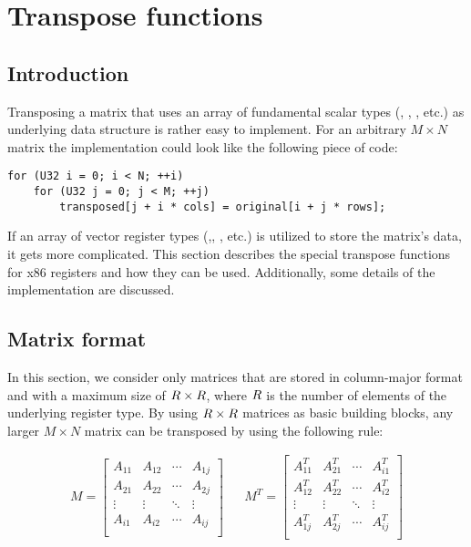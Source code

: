 \section{Transpose functions}

\subsection{Introduction}
Transposing a matrix that uses an array of fundamental scalar types (, , , etc.) as underlying data structure is rather easy to implement.
For an arbitrary $M \times N$ matrix the implementation could look like the following piece of code:

\begin{verbatim}
for (U32 i = 0; i < N; ++i)
    for (U32 j = 0; j < M; ++j)
        transposed[j + i * cols] = original[i + j * rows];
\end{verbatim}

If an array of vector register types (,, , etc.) is utilized to store the matrix's data, it gets more complicated.
This section describes the special transpose functions for x86 registers and how they can be used.
Additionally, some details of the implementation are discussed.

\subsection{Matrix format}
\label{sec:transpose_matrix_format}
In this section, we consider only matrices that are stored in column-major format and with a maximum size of $R \times R$, where $R$ is the number of elements of the underlying register type.
By using $R \times R$ matrices as basic building blocks, any larger $M \times N$ matrix can be transposed by using the following rule:

\begin{align}
\label{eq:block_matrix_transpose}
M =
\begin{bmatrix}
A_{11} & A_{12} & \cdots & A_{1j}\\
A_{21} & A_{22} & \cdots & A_{2j}\\
\vdots & \vdots & \ddots &\vdots \\
A_{i1} & A_{i2} & \cdots & A_{ij}\\
\end{bmatrix} && 
M^T =
\begin{bmatrix}
A_{11}^T & A_{21}^T & \cdots & A_{i1}^T\\
A_{12}^T & A_{22}^T & \cdots & A_{i2}^T\\
\vdots   & \vdots   & \ddots &\vdots \\
A_{1j}^T & A_{2j}^T & \cdots & A_{ij}^T\\
\end{bmatrix}  
\end{align}

